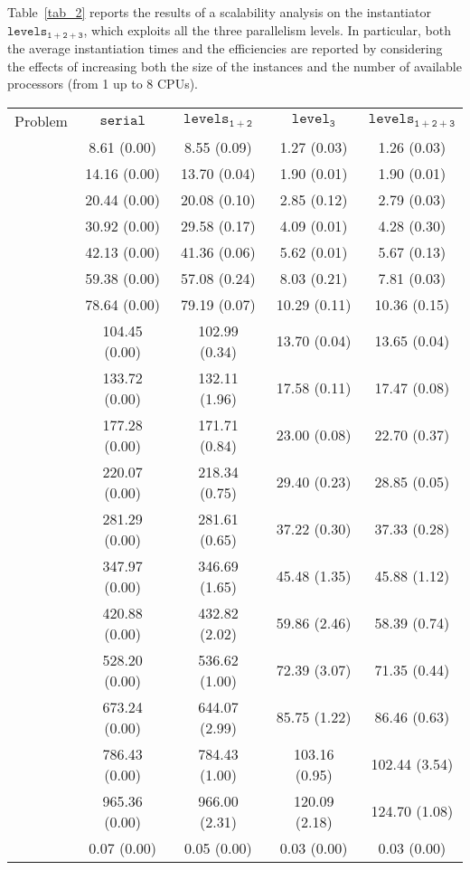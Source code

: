 \documentclass[preprint]{tlp}
\newcommand{\serial}{\ensuremath{\mathtt{serial}}\xspace}
\newcommand{\kali}{\ensuremath{\mathtt{levels_{1\!+\!2}}}\xspace}
\newcommand{\splitonly}{\ensuremath{\mathtt{level_3}}\xspace}
\newcommand{\paral}{\ensuremath{\mathtt{levels_{1\!+\!2\!+\!3}}}\xspace}
\begin{document}
Table~\ref{tab_2} reports the results of a scalability analysis on the instantiator \paral,
which exploits all the three parallelism levels. In particular, both the average instantiation times 
and the efficiencies are reported by considering the effects of increasing both the size of the instances 
and the number of available processors (from 1 up to 8 CPUs).

\begin{table}[b!]
{
\begin{tabular}{| c | c | c | c | c |}
\cline{1-5}
Problem & \serial & \kali & \splitonly & \paral \\
\cline{1-5}
 & 8.61 (0.00) & 8.55 (0.09) & 1.27 (0.03) & 1.26 (0.03) \\
 & 14.16 (0.00) & 13.70 (0.04) & 1.90 (0.01) & 1.90 (0.01) \\
 & 20.44 (0.00) & 20.08 (0.10) & 2.85 (0.12) & 2.79 (0.03) \\
 & 30.92 (0.00) & 29.58 (0.17) & 4.09 (0.01) & 4.28 (0.30) \\
 & 42.13 (0.00) & 41.36 (0.06) & 5.62 (0.01) & 5.67 (0.13) \\
 & 59.38 (0.00) & 57.08 (0.24) & 8.03 (0.21) & 7.81 (0.03) \\
 & 78.64 (0.00) & 79.19 (0.07) & 10.29 (0.11) & 10.36 (0.15) \\
 & 104.45 (0.00) & 102.99 (0.34) & 13.70 (0.04) & 13.65 (0.04) \\
 & 133.72 (0.00) & 132.11 (1.96) & 17.58 (0.11) & 17.47 (0.08) \\
 & 177.28 (0.00) & 171.71 (0.84) & 23.00 (0.08) & 22.70 (0.37) \\
 & 220.07 (0.00) & 218.34 (0.75) & 29.40 (0.23) & 28.85 (0.05) \\
 & 281.29 (0.00) & 281.61 (0.65) & 37.22 (0.30) & 37.33 (0.28) \\
 & 347.97 (0.00) & 346.69 (1.65) & 45.48 (1.35) & 45.88 (1.12) \\
 & 420.88 (0.00) & 432.82 (2.02) & 59.86 (2.46) & 58.39 (0.74) \\
 & 528.20 (0.00) & 536.62 (1.00) & 72.39 (3.07) & 71.35 (0.44) \\
 & 673.24 (0.00) & 644.07 (2.99) & 85.75 (1.22) & 86.46 (0.63) \\
 & 786.43 (0.00) & 784.43 (1.00) & 103.16 (0.95) & 102.44 (3.54) \\
 & 965.36 (0.00) & 966.00 (2.31) & 120.09 (2.18) & 124.70 (1.08) \\
\cline{1-5}
 & 0.07 (0.00) & 0.05 (0.00) & 0.03 (0.00) & 0.03 (0.00) \\ 

\end{tabular}}
\end{table}
\end{document}
